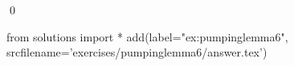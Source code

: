 
\begin{ex} 
  \label{ex:pumpinglemma6}
  
  \qed
\end{ex} 
\begin{python0}
from solutions import *
add(label="ex:pumpinglemma6",
    srcfilename='exercises/pumpinglemma6/answer.tex') 
\end{python0}
